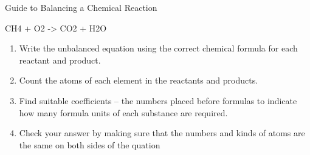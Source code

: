 \documentclass[handout]{beamer}
\begin{document}
\begin{frame}[t]{Guide to Balancing a Chemical Reaction}
	\begin{example}
		\begin{reaction*}
			CH4\gas{} + O2\gas{} -> CO2\gas{} + H2O\lqd{}
		\end{reaction*}
	\end{example}

	\begin{enumerate}[<+->]
		\item Write the unbalanced equation using the correct chemical
			formula for each reactant and product.
		\item Count the atoms of each element in the reactants and
			products.
		\item Find suitable \alert{coefficients} -- the numbers placed
			before formulas to indicate how many formula units of
			each substance are required.
		\item Check your answer by making sure that the numbers and
			kinds of atoms are the same on both sides of the quation
	\end{enumerate}

	\bigskip

\end{frame}
\end{document}
